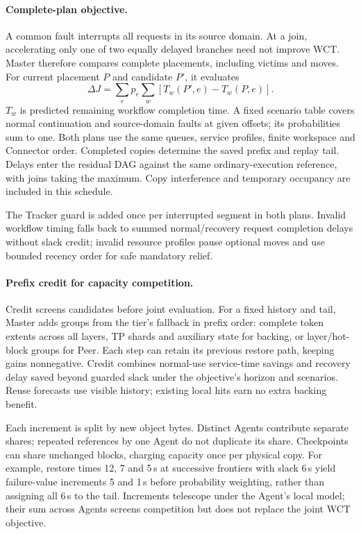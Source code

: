 \paragraph{Complete-plan objective.}
A common fault interrupts all requests in its source domain. At a join,
accelerating only one of two equally delayed branches need not improve
WCT. Master therefore compares complete placements, including victims
and moves. For current placement $P$ and candidate $P'$, it evaluates
\begin{equation}
 \Delta J=\sum_e p_e\sum_w[T_w(P',e)-T_w(P,e)].
 \label{eq:value}
\end{equation}
$T_w$ is predicted remaining workflow completion time. A fixed scenario
table covers normal continuation and source-domain faults at given offsets;
its probabilities sum to one. Both plans use the same queues, service
profiles, finite workspace and Connector order. Completed copies determine
the saved prefix and replay tail. Delays enter the residual DAG against
the same ordinary-execution reference, with joins taking the maximum.
Copy interference and temporary occupancy are included in this schedule.

The Tracker guard is added once per interrupted segment in both plans.
Invalid workflow timing falls back to summed normal/recovery request
completion delays without slack credit; invalid resource profiles pause
optional moves and use bounded recency order for safe mandatory relief.

\paragraph{Prefix credit for capacity competition.}
Credit screens candidates before joint evaluation. For a fixed history
and tail, Master adds groups from the tier's fallback in prefix order:
complete token extents across all layers, TP shards and auxiliary state
for backing, or layer/hot-block groups for Peer. Each step can retain
its previous restore path, keeping gains nonnegative. Credit combines
normal-use service-time savings and recovery delay saved beyond guarded
slack under the objective's horizon and scenarios. Reuse forecasts use
visible history; existing local hits earn no extra backing benefit.

Each increment is split by new object bytes. Distinct Agents contribute
separate shares; repeated references by one Agent do not duplicate its
share. Checkpoints can share unchanged blocks, charging capacity once per
physical copy. For example, restore times
12, 7 and 5\,s at successive frontiers with slack 6\,s yield failure-value
increments 5 and 1\,s before probability weighting, rather than assigning
all 6\,s to the tail. Increments telescope under the Agent's local model;
their sum across Agents screens competition but does not replace the
joint WCT objective.

